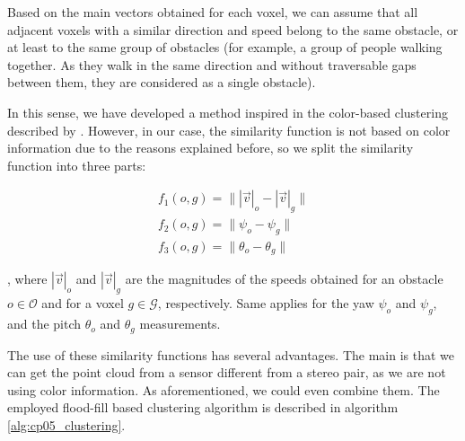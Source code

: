 Based on the main vectors obtained for each voxel, we can assume that all adjacent voxels with a similar direction and speed belong to the same obstacle, or at least to the same group of obstacles (for example, a group of people walking together. As they walk in the same direction and without traversable gaps between them, they are considered as a single obstacle).

In this sense, we have developed a method inspired in the color-based clustering described by \cite{broggi2013}. However, in our case, the similarity function is not based on color information due to the reasons explained before, so we split the similarity function into three parts:

\begin{equation}\label{eq:cp05_similarity_functions}
\begin{array}{l}
f_1(o,g)=\| |\vec{v}|_o - |\vec{v}|_g \|\\
f_2(o,g)=\| \psi_o - \psi_g \|\\
f_3(o,g)=\| \theta_o - \theta_g \|
\end{array}
\end{equation}

, where $|\vec{v}|_o$ and $|\vec{v}|_g$ are the magnitudes of the speeds obtained for an obstacle $o \in \mathcal{O}$ and for a voxel $g \in \mathcal{G}$, respectively. Same applies for the yaw $\psi_o$ and $\psi_g$, and the pitch $\theta_o$ and $\theta_g$ measurements.

The use of these similarity functions has several advantages. The main is that we can get the point cloud from a sensor different from a stereo pair, as we are not using color information. As aforementioned, we could even combine them. The employed flood-fill based clustering algorithm is described in algorithm \ref{alg:cp05_clustering}.

